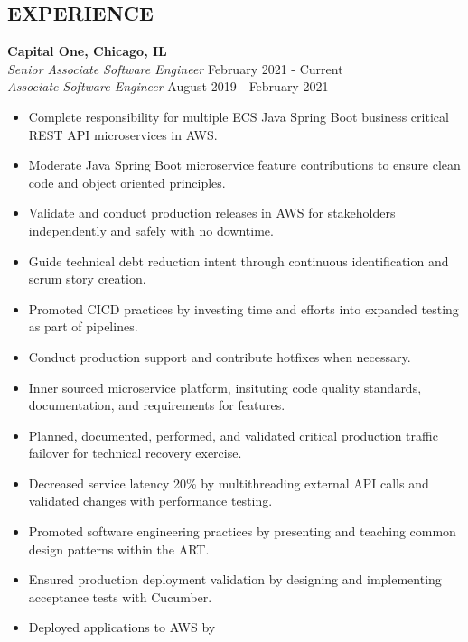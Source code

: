 \documentclass[overlapped]{res}
\begin{document}
\begin{resume}
\section{EXPERIENCE}
\textbf{Capital One, Chicago, IL}  \\
{\sl Senior Associate Software Engineer} \hfill February 2021 - Current \\
{\sl Associate Software Engineer} \hfill August 2019 - February 2021
\begin{itemize}  \itemsep -2pt %
    \item Complete responsibility for multiple ECS Java Spring Boot business critical REST API microservices in AWS.
    \item Moderate Java Spring Boot microservice feature contributions to ensure clean code and object oriented principles.  %
    \item Validate and conduct production releases in AWS for stakeholders independently and safely with no downtime.
    \item Guide technical debt reduction intent through continuous identification and scrum story creation.
    \item Promoted CICD practices by investing time and efforts into expanded testing as part of pipelines.
    \item Conduct production support and contribute hotfixes when necessary.
    \item Inner sourced microservice platform, insituting code quality standards, documentation, and requirements for features.
    \item Planned, documented, performed, and validated critical production traffic failover for technical recovery exercise. 
    \item Decreased service latency 20\% by multithreading external
    API calls and validated changes with performance testing.
    \item Promoted software engineering practices by presenting and teaching common design patterns within the ART. 
    \item Ensured production deployment validation by designing 
    and implementing acceptance tests with Cucumber.
    \item Deployed applications to AWS by

\end{itemize}
\end{resume}
\end{document}
